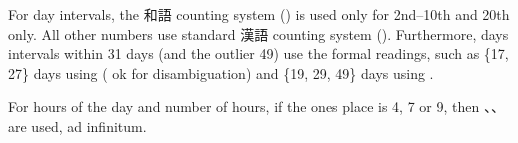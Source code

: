 \documentclass[../nihongo-gakushuu-kyouzai.tex]{subfiles}
\begin{document}
\begin{multicols}{2}
For day intervals, the 和語 counting system () is used only for 2nd--10th and 20th only. All other numbers use standard 漢語 counting system (). Furthermore, days intervals within 31 days (and the outlier 49) use the formal readings, such as \{17, 27\} days using  ( ok for disambiguation) and \{19, 29, 49\} days using .

For hours of the day and number of hours, if the ones place is 4, 7 or 9, then 、、 are used, ad infinitum.
\color{black}



\end{multicols}
\end{document}
